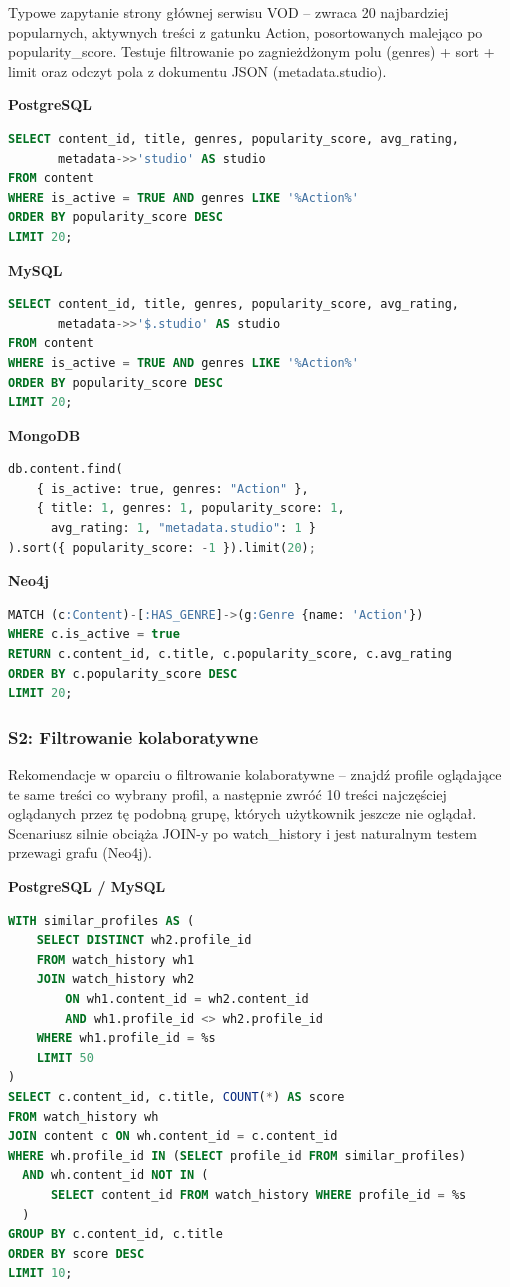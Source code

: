 Typowe zapytanie strony głównej serwisu VOD -- zwraca 20 najbardziej popularnych,
aktywnych treści z gatunku Action, posortowanych malejąco po popularity\_score.
Testuje filtrowanie po zagnieżdżonym polu (genres) + sort + limit oraz odczyt
pola z dokumentu JSON (metadata.studio).

\textbf{PostgreSQL}
\begin{lstlisting}[language=SQL]
SELECT content_id, title, genres, popularity_score, avg_rating,
       metadata->>'studio' AS studio
FROM content
WHERE is_active = TRUE AND genres LIKE '%Action%'
ORDER BY popularity_score DESC
LIMIT 20;
\end{lstlisting}

\textbf{MySQL}
\begin{lstlisting}[language=SQL]
SELECT content_id, title, genres, popularity_score, avg_rating,
       metadata->>'$.studio' AS studio
FROM content
WHERE is_active = TRUE AND genres LIKE '%Action%'
ORDER BY popularity_score DESC
LIMIT 20;
\end{lstlisting}

\textbf{MongoDB}
\begin{lstlisting}[language=Python]
db.content.find(
    { is_active: true, genres: "Action" },
    { title: 1, genres: 1, popularity_score: 1,
      avg_rating: 1, "metadata.studio": 1 }
).sort({ popularity_score: -1 }).limit(20);
\end{lstlisting}

\textbf{Neo4j}
\begin{lstlisting}[language=SQL]
MATCH (c:Content)-[:HAS_GENRE]->(g:Genre {name: 'Action'})
WHERE c.is_active = true
RETURN c.content_id, c.title, c.popularity_score, c.avg_rating
ORDER BY c.popularity_score DESC
LIMIT 20;
\end{lstlisting}


\subsubsection{S2: Filtrowanie kolaboratywne}

Rekomendacje w oparciu o filtrowanie kolaboratywne -- znajdź profile oglądające
te same treści co wybrany profil, a następnie zwróć 10 treści najczęściej
oglądanych przez tę podobną grupę, których użytkownik jeszcze nie oglądał.
Scenariusz silnie obciąża JOIN-y po watch\_history i jest naturalnym testem
przewagi grafu (Neo4j).

\textbf{PostgreSQL / MySQL}
\begin{lstlisting}[language=SQL]
WITH similar_profiles AS (
    SELECT DISTINCT wh2.profile_id
    FROM watch_history wh1
    JOIN watch_history wh2
        ON wh1.content_id = wh2.content_id
        AND wh1.profile_id <> wh2.profile_id
    WHERE wh1.profile_id = %s
    LIMIT 50
)
SELECT c.content_id, c.title, COUNT(*) AS score
FROM watch_history wh
JOIN content c ON wh.content_id = c.content_id
WHERE wh.profile_id IN (SELECT profile_id FROM similar_profiles)
  AND wh.content_id NOT IN (
      SELECT content_id FROM watch_history WHERE profile_id = %s
  )
GROUP BY c.content_id, c.title
ORDER BY score DESC
LIMIT 10;
\end{lstlisting}

